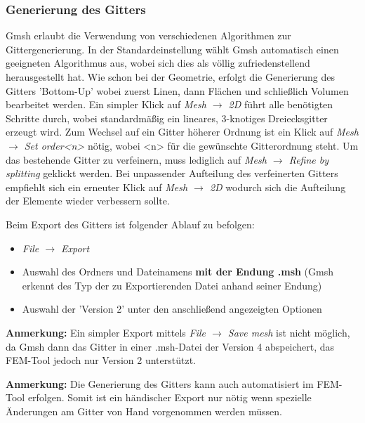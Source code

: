  \subsubsection{Generierung des Gitters}
 Gmsh erlaubt die Verwendung von verschiedenen Algorithmen zur Gittergenerierung. In der Standardeinstellung wählt Gmsh automatisch einen geeigneten Algorithmus aus, wobei sich dies als völlig zufriedenstellend herausgestellt hat. Wie schon bei der Geometrie, erfolgt die Generierung des Gitters 'Bottom-Up' wobei zuerst Linen, dann Flächen und schließlich Volumen bearbeitet werden. Ein simpler Klick auf \textit{Mesh $\rightarrow$ 2D} führt alle benötigten Schritte durch, wobei standardmäßig ein lineares, 3-knotiges Dreiecksgitter erzeugt wird. Zum Wechsel auf ein Gitter höherer Ordnung ist ein Klick auf \textit{Mesh $\rightarrow$ Set order<n>} nötig, wobei <n> für die gewünschte Gitterordnung steht. Um das bestehende Gitter zu verfeinern, muss lediglich auf \textit{Mesh $\rightarrow$ Refine by splitting} geklickt werden. Bei unpassender Aufteilung des verfeinerten Gitters empfiehlt sich ein erneuter Klick auf \textit{Mesh $\rightarrow$ 2D} wodurch sich die Aufteilung der Elemente wieder verbessern sollte.\newline
 
 Beim Export des Gitters ist folgender Ablauf zu befolgen:
 \begin{itemize}
 	\item \textit{File $\rightarrow$ Export}
 	\item Auswahl des Ordners und Dateinamens \textbf{mit der Endung .msh} (Gmsh erkennt des Typ der zu Exportierenden Datei anhand seiner Endung)
 	\item Auswahl der 'Version 2' unter den anschließend angezeigten Optionen
 \end{itemize}

\textbf{Anmerkung:} Ein simpler Export mittels \textit{File $\rightarrow$ Save mesh} ist nicht möglich, da Gmsh dann das Gitter in einer .msh-Datei der Version 4 abspeichert, das FEM-Tool jedoch nur Version 2 unterstützt.\newline

\textbf{Anmerkung:} Die Generierung des Gitters kann auch automatisiert im FEM-Tool erfolgen. Somit ist ein händischer Export nur nötig wenn spezielle Änderungen am Gitter von Hand vorgenommen werden müssen.